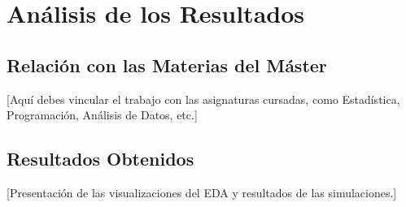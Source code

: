 \chapter{Análisis de los Resultados}

\section{Relación con las Materias del Máster}
[Aquí debes vincular el trabajo con las asignaturas cursadas, como Estadística, Programación, Análisis de Datos, etc.]

\section{Resultados Obtenidos}
[Presentación de las visualizaciones del EDA y resultados de las simulaciones.]
